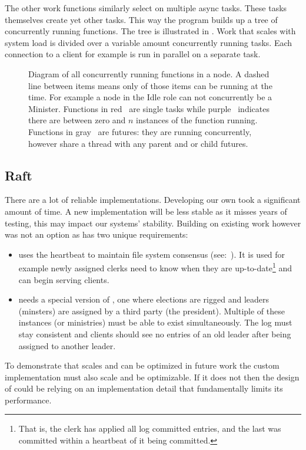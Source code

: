 The other work functions similarly select on multiple async tasks. These tasks themselves create yet other tasks. This way the program builds up a tree of concurrently running functions. The tree is illustrated in . Work that scales with system load is divided over a variable amount concurrently running tasks. Each connection to a client for example is run in parallel on a separate task.
%
\clearpage
\thispagestyle{empty}
\begin{figure}[htbp]
	\centering
	
	\caption{Diagram of all concurrently running functions in a node. A dashed line between items means only of those items can be running at the time. For example a node in the Idle role can not concurrently be a Minister. Functions in red~\taskLeg{} are single tasks while purple~\tasksLeg{} indicates there are between zero and $n$ instances of the function running. Functions in gray~\futureLeg{} are futures: they are running concurrently, however share a thread with any parent and or child futures.}
	\label{fig:tree}
\end{figure}
\clearpage

\subsection{Raft}
There are a lot of reliable \raft{} implementations. Developing our own took a significant amount of time. A new implementation will be less stable as it misses years of testing, this may impact our systems' stability. Building on existing work however was not an option as \name{} has two unique requirements: 
%
\begin{itemize}
	\item \Name{} uses the \raft{} heartbeat to maintain file system consensus (see:~). It is used for example newly assigned clerks need to know when they are up-to-date\footnote{That is, the clerk has applied all log committed entries, and the last was committed within a \raft{} heartbeat of it being committed.} and can begin serving clients. 
	\item \Name{} needs a special version of \raft{}, one where elections are rigged and leaders (minsters) are assigned by a third party (the president). Multiple of these instances (or ministries) must be able to exist simultaneously. The log must stay consistent and clients should see no entries of an old leader after being assigned to another leader. 
\end{itemize}
%
To demonstrate that \name{} scales and can be optimized in future work %
the custom implementation must also scale and be optimizable. If it does not then the design of \name{} could be relying on an implementation detail that fundamentally limits its performance.
%
